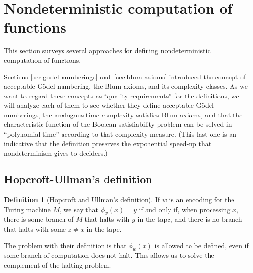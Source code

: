 \documentclass[12pt]{article}
\theoremstyle{definition}
\newtheorem{definition}{Definition}
\begin{document}
\section{Nondeterministic computation of functions}
\label{sec:nondeterministic_computation_of_functions}

This section surveys several approaches
for defining nondeterministic computation of functions.

Sections \ref{sec:godel-numberings} and~\ref{sec:blum-axioms}
introduced the concept of acceptable Gödel numbering,
the Blum axioms,
and its complexity classes.
As we want to regard these concepts as ``quality requirements''
for the definitions,
we will analyze each of them to see whether they define acceptable Gödel numberings,
the analogous time complexity satisfies Blum axioms,
and that the characteristic function\footnotemark{} of the Boolean satisfiability problem
can be solved in ``polynomial time'' according to that complexity measure.
(This last one is an indicative that
the definition preserves the exponential speed-up that nondeterminism gives to deciders.)

\subsection{Hopcroft-Ullman's definition}
\label{sec:hopcroft-ullman}

\begin{definition}[Hopcroft and Ullman's definition\footnotemark]
    If $w$ is an encoding for the Turing machine $M$,
    we say that $\phi_w(x) = y$ if and only if,
    when processing $x$,
    there is some branch of $M$ that halts with $y$ in the tape,
    and there is no branch that halts with some $z \neq x$ in the tape.
\end{definition}

The problem with their definition is that $\phi_w(x)$ is allowed to be defined,
even if some branch of computation does not halt.
This allows us to solve the complement of the halting problem.
\end{document}
